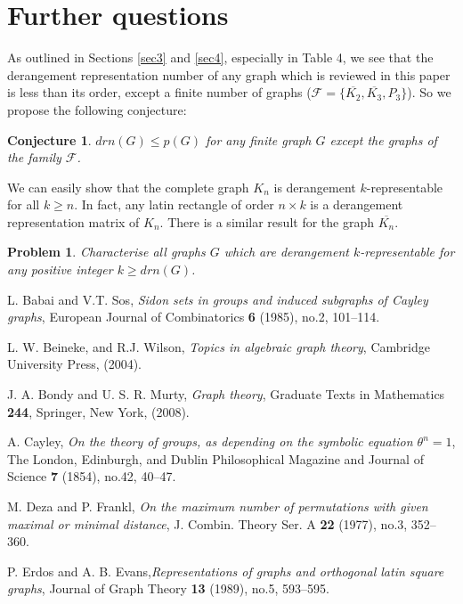 \documentclass[11pt,letterpaper]{article}
\newtheorem{problem}[theorem]{Problem}
\newtheorem{conjecture}[theorem]{Conjecture}
\begin{document}
{\section{Further questions}\label{sec5}
As outlined in Sections \ref{sec3} and \ref{sec4}, especially in Table 4, we see that the derangement representation number of any graph which is reviewed in this paper is less than its order, except a finite number of graphs ($\mathcal{F}=\{\overline{K_2}, \overline{K_3}, P_3\}$). So we propose the following conjecture:
\begin{conjecture}\label{conj1}
$drn(G)\leq p(G)$ for any finite graph $G$ except the graphs of the family $\mathcal{F}$.
\end{conjecture}
We can easily show that the complete graph $K_n$ is derangement $k$-representable for all $k\geq n$. In fact, any latin rectangle of order $n\times k$ is a derangement representation matrix of $K_n$. There is a similar result for the graph $\overline{K_n}$.
\begin{problem}
Characterise all graphs $G$ which are derangement $k$-representable for any positive integer $k\geq drn(G)$.
\end{problem}
\begin{thebibliography}{}

L. Babai  and  V.T. Sos,  {\it Sidon sets in groups and induced subgraphs of Cayley graphs}, European Journal of Combinatorics \textbf{6} (1985), no.2, 101--114.

L. W. Beineke, and R.J. Wilson, {\it Topics in algebraic graph theory}, Cambridge University Press, (2004).

J. A. Bondy and U. S. R. Murty, {\it Graph theory}, Graduate Texts in Mathematics \textbf{244}, Springer, New York, (2008).
			
A. Cayley, {\it On the theory of groups, as depending on the symbolic equation $\theta^n=1$}, The London, Edinburgh, and Dublin Philosophical Magazine and Journal of Science \textbf{7} (1854), no.42, 40--47.

M. Deza and P. Frankl, {\it On the maximum number of permutations with given maximal or minimal distance}, J. Combin. Theory Ser. A \textbf{22} (1977), no.3, 352--360.

P. Erdos  and A. B. Evans,{\it Representations of graphs and orthogonal latin square graphs}, Journal of Graph Theory \textbf{13} (1989), no.5, 593--595.


\end{thebibliography}}
\end{document}
